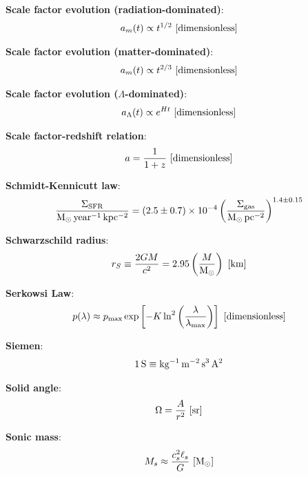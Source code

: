 \documentclass[a4paper,10pt]{article}
\begin{document}
{\noindent}\textbf{Scale factor evolution (radiation-dominated)}:
\begin{align*}
    a_m(t) \propto t^{1/2} ~ [{\rm dimensionless}]
\end{align*}

{\noindent}\textbf{Scale factor evolution (matter-dominated)}:
\begin{align*}
    a_m(t) \propto t^{2/3} ~ [{\rm dimensionless}]
\end{align*}

{\noindent}\textbf{Scale factor evolution ($\Lambda$-dominated)}:
\begin{align*}
    a_\Lambda(t) \propto e^{Ht} ~ [{\rm dimensionless}]
\end{align*}

{\noindent}\textbf{Scale factor-redshift relation}:
\begin{align*}
    a = \dfrac{1}{1+z} ~ [{\rm dimensionless}]
\end{align*}

{\noindent}\textbf{Schmidt-Kennicutt law}:
\begin{align*}
    \frac{\Sigma_\mathrm{SFR}}{{\rm M_\odot\,year^{-1}\,kpc^{-2}}} = (2.5\pm0.7)\times10^{-4} \left(\frac{\Sigma_\mathrm{gas}}{{\rm M_\odot\,pc^{-2}}}\right)^{1.4\pm0.15}
\end{align*}

{\noindent}\textbf{Schwarzschild radius}:
\begin{align*}
    r_S \equiv \frac{2GM}{c^2} = 2.95\left(\frac{M}{{\rm M_\odot}}\right) ~ [{\rm km}]
\end{align*}

{\noindent}\textbf{Serkowsi Law}:
\begin{align*}
    p(\lambda) \approx p_\mathrm{max}\exp \left[-K\ln^2\left(\frac{\lambda}{\lambda_\mathrm{max}}\right)\right] ~ [{\rm dimensionless}]
\end{align*}

{\noindent}\textbf{Siemen}:
\begin{align*}
    {\rm 1\,S \equiv kg^{-1}\,m^{-2}\,s^3\,A^2}
\end{align*}

{\noindent}\textbf{Solid angle}:
\begin{align*}
    \Omega = \frac{A}{r^2} ~ [{\rm sr}]
\end{align*}

{\noindent}\textbf{Sonic mass}:
\begin{align*}
    M_s \approx \frac{c_s^2\ell_s}{G} ~ [{\rm M_\odot}]
\end{align*}
\end{document}

